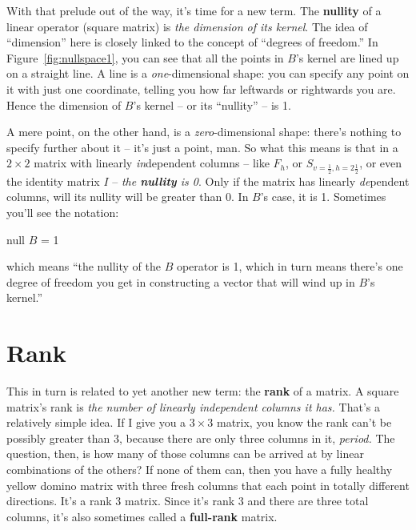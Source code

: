 
With that prelude out of the way, it's time for a new term. The
\textbf{nullity} of a linear operator (square matrix) is \textit{the dimension
of its kernel}. The idea of ``dimension'' here is closely linked to the concept
of ``degrees of freedom.'' In Figure~\ref{fig:nullspace1}, you can see that all
the points in $B$'s kernel are lined up on a straight line. A line is a
\textit{one}-dimensional shape: you can specify any point on it with just one
coordinate, telling you how far leftwards or rightwards you are. Hence the
dimension of $B$'s kernel -- or its ``nullity'' -- is 1.

A mere point, on the other hand, is a \textit{zero}-dimensional shape: there's
nothing to specify further about it -- it's just a point, man. So what this
means is that in a $2\times 2$ matrix with linearly \textit{in}dependent
columns -- like $F_{h}$, or $S_{v=\frac{1}{2},h=2\frac{1}{2}}$, or even the
identity matrix $I$ -- \textit{the \textbf{nullity} is 0}. Only if the matrix
has linearly \textit{de}pendent columns, will its nullity will be greater than
0. In $B$'s case, it is 1. Sometimes you'll see the notation:

\vspace{-.15in}
\begin{center}
null $B$ = 1
\end{center}
\vspace{-.15in}

which means ``the nullity of the $B$ operator is 1, which in turn means there's
one degree of freedom you get in constructing a vector that will wind up in
$B$'s kernel.''

\section{Rank}

This in turn is related to yet another new term: the \textbf{rank} of a matrix.
A square matrix's rank is \textit{the number of linearly independent columns it
has.} That's a relatively simple idea. If I give you a $3\times 3$ matrix, you
know the rank can't be possibly greater than 3, because there are only three
columns in it, \textit{period.} The question, then, is how many of those
columns can be arrived at by linear combinations of the others? If none of them
can, then you have a fully healthy yellow domino matrix with three fresh
columns that each point in totally different directions. It's a rank 3 matrix.
Since it's rank 3 and there are three total columns, it's also sometimes called
a \textbf{full-rank} matrix.

